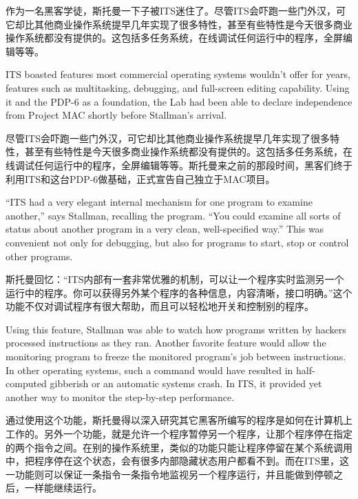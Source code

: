 \ifdefined\chs
作为一名黑客学徒，斯托曼一下子被ITS迷住了。尽管ITS会吓跑一些门外汉，可它却比其他商业操作系统提早几年实现了很多特性，甚至有些特性是今天很多商业操作系统都没有提供的。这包括多任务系统，在线调试任何运行中的程序，全屏编辑等等。
\fi
\fi

\ifdefined\vone
\ifdefined\eng
ITS boasted features most commercial operating systems wouldn't offer for years, features such as multitasking, debugging, and full-screen editing capability. Using it and the PDP-6 as a foundation, the Lab had been able to declare independence from Project MAC shortly before Stallman's arrival.
\fi

\ifdefined\chs
尽管ITS会吓跑一些门外汉，可它却比其他商业操作系统提早几年实现了很多特性，甚至有些特性是今天很多商业操作系统都没有提供的。这包括多任务系统，在线调试任何运行中的程序，全屏编辑等等。斯托曼来之前的那段时间，黑客们终于利用ITS和这台PDP-6做基础，正式宣告自己独立于MAC项目。
\fi
\fi

\ifdefined\eng
``ITS had a very elegant internal mechanism for one program to examine another,'' says Stallman, recalling the program. ``You could examine all sorts of status about another program in a very clean, well-specified way.'' \ifdefined\vtwo This was convenient not only for debugging, but also for programs to start, stop or control other programs.\fi
\fi

\ifdefined\chs
斯托曼回忆：``ITS内部有一套非常优雅的机制，可以让一个程序实时监测另一个运行中的程序。你可以获得另外某个程序的各种信息，内容清晰，接口明确。''\ifdefined\vtwo 这个功能不仅对调试程序有很大帮助，而且可以轻松地开关和控制别的程序。\fi
\fi

\ifdefined\vone
\ifdefined\eng
Using this feature, Stallman was able to watch how programs written by hackers processed instructions as they ran. Another favorite feature would allow the monitoring program to freeze the monitored program's job between instructions. In other operating systems, such a command would have resulted in half-computed gibberish or an automatic systems crash. In ITS, it provided yet another way to monitor the step-by-step performance.
\fi

\ifdefined\chs
通过使用这个功能，斯托曼得以深入研究其它黑客所编写的程序是如何在计算机上工作的。另外一个功能，就是允许一个程序暂停另一个程序，让那个程序停在指定的两个指令之间。在别的操作系统里，类似的功能只能让程序停留在某个系统调用中，把程序停在这个状态，会有很多内部隐藏状态用户都看不到。而在ITS里，这一功能则可以保证一条指令一条指令地监视另一个程序运行，并且能做到停顿之后，一样能继续运行。
\fi
\fi

